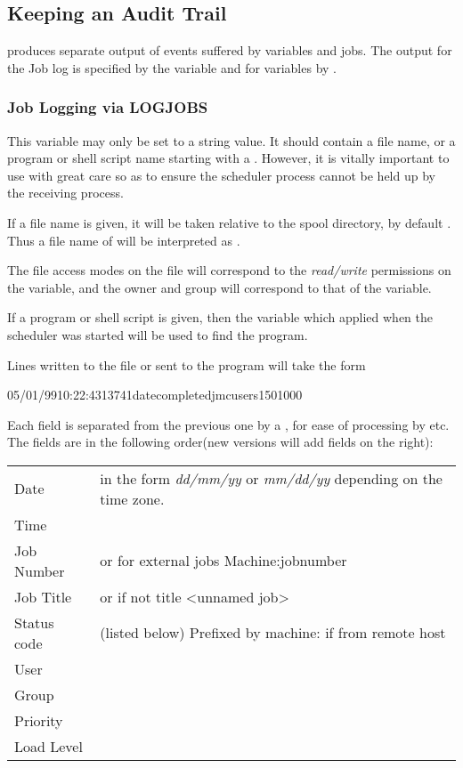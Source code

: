 \subsection{Keeping an Audit Trail}
\ProductName{} produces separate output of events suffered by variables and jobs. The output for the Job log is specified by the variable
 and for variables by .

\subsubsection{Job Logging via LOGJOBS}
This variable may only be set to a string value. It should contain a file name, or a program or shell script name starting with a
\filename{{\textbar}}. However, it is vitally important to use \filename{{\textbar}} with great care so as to ensure the
scheduler process cannot be held up by the receiving process.

If a file name is given, it will be taken relative to the spool directory, by default \spooldir. Thus a file
name of  will be interpreted as .

The file access modes on the file will correspond to the \textit{read/write} permissions on the variable, and the owner and
group will correspond to that of the variable.

If a program or shell script is given, then the  variable which applied when the scheduler was started will be used to
find the program.

Lines written to the file or sent to the program will take the form

\begin{expara}

05/01/99{\textbar}10:22:43{\textbar}13741{\textbar}date{\textbar}completed{\textbar}jmc{\textbar}users{\textbar}150{\textbar}1000

\end{expara}

Each field is separated from the previous one by a \filename{{\textbar}}, for ease of processing by  etc. The fields are in the following order(new versions will add fields on the right):

\begin{tabular}{l l}
Date & in the form \textit{dd/mm/yy} or \textit{mm/dd/yy} depending
on the time zone.\\
Time & ~ \\
Job Number &
or for external jobs Machine:jobnumber\\
Job Title & or if not title {\textless}unnamed job{\textgreater}\\
Status code & (listed below) Prefixed by machine: if from remote host\\
User & ~ \\
Group & ~ \\
Priority & ~ \\
Load Level & ~ \\
\end{tabular}

